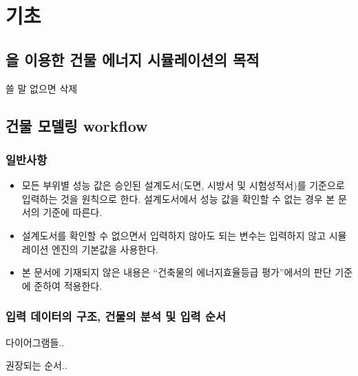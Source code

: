 
\part {기초}

\chapter{\simulator 을 이용한 건물 에너지 시뮬레이션의 목적}

쓸 말 없으면 삭제

\chapter{건물 모델링 workflow}

\section{일반사항}

\begin{itemize}
    \item 모든 부위별 성능 값은 승인된 설계도서(도면, 시방서 및 시험성적서)를 기준으로 입력하는 것을 원칙으로 한다. 설계도서에서 성능 값을 확인할 수 없는 경우 본 문서의 기준에 따른다.
    \item 설계도서를 확인할 수 없으면서 입력하지 않아도 되는 변수는 입력하지 않고 시뮬레이션 엔진의 기본값을 사용한다.
    \item 본 문서에 기재되지 않은 내용은 ``건축물의 에너지효율등급 평가''에서의 판단 기준에 준하여 적용한다. 
\end{itemize}

\section{입력 데이터의 구조, 건물의 분석 및 입력 순서}
다이어그램들..

권장되는 순서..